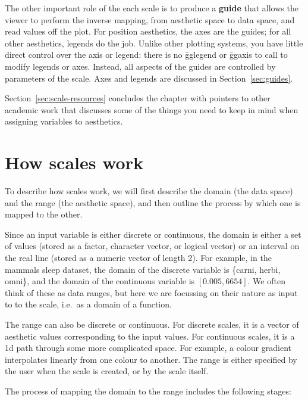 The other important role of the each scale is to produce a {\bf guide} that allows the viewer to perform the inverse mapping, from aesthetic space to data space, and read values off the plot. For position aesthetics, the axes are the guides; for all other aesthetics, legends do the job. Unlike other plotting systems, you have little direct control over the axis or legend: there is no \f{gglegend} or \f{ggaxis} to call to modify legends or axes.  Instead, all aspects of the guides are controlled by parameters of the scale. Axes and legends are discussed in Section~\ref{sec:guides}.


Section~\ref{sec:scale-resources} concludes the chapter with pointers to other academic work that discusses some of the things you need to keep in mind when assigning variables to aesthetics.

\section{How scales work}
\label{sec:how-scales-work}

To describe how scales work, we will first describe the domain (the data space) and the range (the aesthetic space), and then outline the process by which one is mapped to the other.

Since an input variable is either discrete or continuous, the domain is either a set of values (stored as a factor, character vector, or logical vector) or an interval on the real line (stored as a numeric vector of length 2). For example, in the mammals sleep dataset, the domain of the discrete variable  is \{carni, herbi, omni\}, and the domain of the continuous variable  is $[0.005, 6654]$.  We often think of these as data ranges, but here we are focussing on their nature as input to to the scale, i.e.\ as a domain of a function.

The range can also be discrete or continuous. For discrete scales, it is a vector of aesthetic values corresponding to the input values. For continuous scales, it is a 1d path through some more complicated space. For example, a colour gradient interpolates linearly from one colour to another. The range is either specified by the user when the scale is created, or by the scale itself.

The process of mapping the domain to the range includes the following stages:

